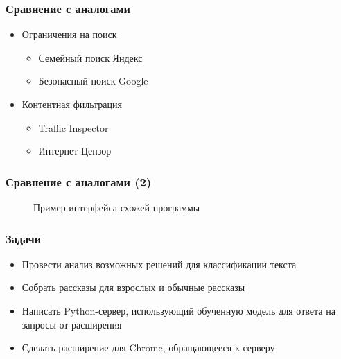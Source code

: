 \documentclass[xetex,mathserif,serif]{beamer}
\begin{document}
	\begin{frame}
		\frametitle{Сравнение с аналогами}
			\begin{itemize}
				\item Ограничения на поиск
					\begin{itemize}
				    	\item Семейный поиск Яндекс
				    	\item Безопасный поиск Google
			    	\end{itemize}
			    \item Контентная фильтрация
					\begin{itemize}
				    	\item Traffic Inspector
				    	\item Интернет Цензор
			    	\end{itemize}
			\end{itemize}
	\end{frame}
	
	\begin{frame}
		\frametitle{Сравнение с аналогами (2)}
		\begin{figure}[h]
            \caption{Пример интерфейса схожей программы}
            \label{fig:image}
        \end{figure}
	\end{frame}	
	
	\begin{frame}
		\frametitle{Задачи}
			\begin{itemize}
		 		\item Провести анализ возможных решений для классификации текста
		 		\item Собрать рассказы для взрослых и обычные рассказы
		 		\item Написать Python-сервер, использующий обученную модель для ответа на запросы от расширения
		 		\item Сделать расширение для Chrome, обращающееся к серверу
			\end{itemize}
	\end{frame}	
	
\end{document}
